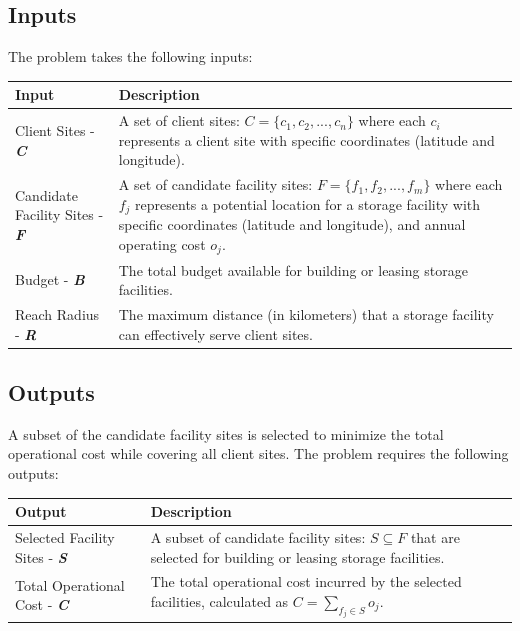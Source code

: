 \documentclass[letterpaper]{article}
\begin{document}
\subsection{Inputs}
The problem takes the following inputs:
\begin{table}[H]
    \centering 
    \renewcommand{\arraystretch}{1.3} %
    \begin{tabular}{l p{}}
        \toprule
        \textbf{Input} & \textbf{Description} \\
        \midrule 
        Client Sites - \textbf{\textit{C}}             & A set of client sites: $C = \{c_1, c_2, ..., c_n\}$ where each $c_i$ represents a client site with specific coordinates (latitude and longitude). \\
        Candidate Facility Sites - \textbf{\textit{F}} & A set of candidate facility sites: $F = \{f_1, f_2, ..., f_m\}$ where each $f_j$ represents a potential location for a storage facility with specific coordinates (latitude and longitude), and annual operating cost $o_j$. \\
        Budget - \textbf{\textit{B}}                   & The total budget available for building or leasing storage facilities. \\
        Reach Radius - \textbf{\textit{R}}             & The maximum distance (in kilometers) that a storage facility can effectively serve client sites. \\
        \bottomrule
    \end{tabular}
\end{table}

\subsection{Outputs}
A subset of the candidate facility sites is selected to minimize the total operational cost while covering all client sites. The problem requires the following outputs:
\begin{table}[H]
    \centering
    \renewcommand{\arraystretch}{1.3} %
    \begin{tabular}{l p{}}
        \toprule
        \textbf{Output} & \textbf{Description} \\
        \midrule
        Selected Facility Sites - \textbf{\textit{S}} & A subset of candidate facility sites: $S \subseteq F$ that are selected for building or leasing storage facilities. \\
        Total Operational Cost - \textbf{\textit{C}}  & The total operational cost incurred by the selected facilities, calculated as $C = \sum_{f_j \in S} o_j$. \\
        \bottomrule
    \end{tabular}
\end{table}
\end{document}
